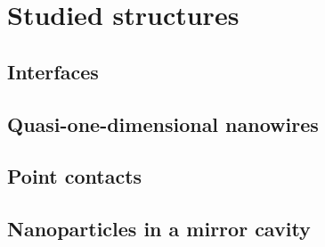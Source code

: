 \section{Studied structures}

\subsection{Interfaces}

\subsection{Quasi-one-dimensional nanowires}

\subsection{Point contacts}

\subsection{Nanoparticles in a mirror cavity}




